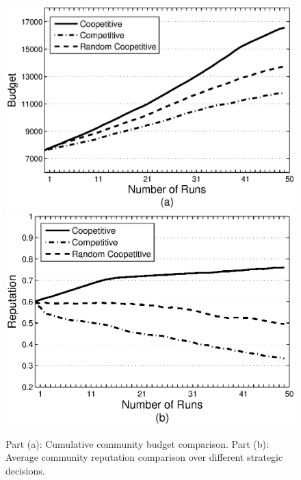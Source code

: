 \begin{figure}%
\includegraphics[scale=0.47]{Figures/graphbgtmed.eps}
\includegraphics[scale=0.47]{Figures/graphrep.eps}
\caption{Part (a): Cumulative community budget comparison. Part
(b): Average community reputation comparison over different
strategic decisions.} \label{Graph1}
\end{figure}





